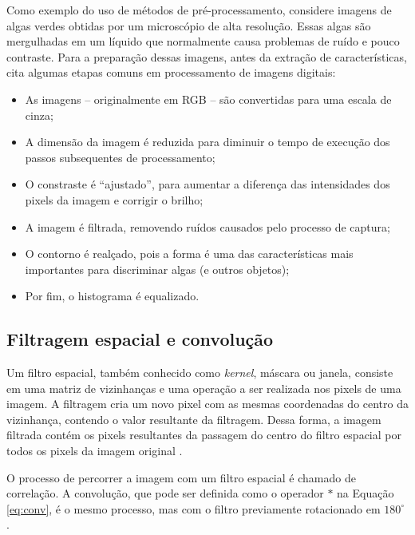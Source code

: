 Como exemplo do uso de métodos de pré-processamento, considere imagens de algas verdes obtidas por um microscópio de alta resolução. Essas algas são mergulhadas em um líquido que normalmente causa problemas de ruído e pouco contraste. Para a preparação dessas imagens, antes da extração de características,  cita algumas etapas comuns em processamento de imagens digitais:

\begin{itemize}
\item As imagens -- originalmente em RGB -- são convertidas para uma escala de cinza;
\item A dimensão da imagem é reduzida para diminuir o tempo de execução dos passos subsequentes de processamento;
\item O constraste é ``ajustado'', para aumentar a diferença das intensidades dos pixels da imagem e corrigir o brilho;
\item A imagem é filtrada, removendo ruídos causados pelo processo de captura;
\item O contorno é realçado, pois a forma é uma das características mais importantes para discriminar algas (e outros objetos);
\item Por fim, o histograma é equalizado.
\end{itemize}

\subsection{Filtragem espacial e convolução}

\label{sec:convolucao}

Um filtro espacial, também conhecido como \textit{kernel}, máscara ou janela, consiste em uma matriz de vizinhanças e uma operação a ser realizada nos pixels de uma imagem. A filtragem cria um novo pixel com as mesmas coordenadas do centro da vizinhança, contendo o valor resultante da filtragem. Dessa forma, a imagem filtrada contém os pixels resultantes da passagem do centro do filtro espacial por todos os pixels da imagem original \cite{Gonzalez2007}.

O processo de percorrer a imagem com um filtro espacial é chamado de correlação. A convolução, que pode ser definida como o operador $*$ na Equação \eqref{eq:conv}, é o mesmo processo, mas com o filtro previamente rotacionado em $180^{\circ}$ \cite{Gonzalez2007}.

